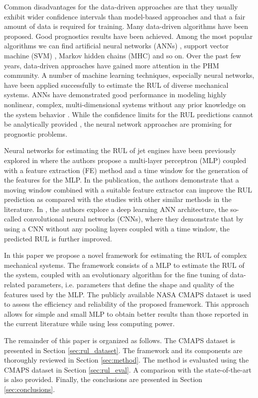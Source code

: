 \documentclass[12pt]{IEEEtran}%
\begin{document}
Common disadvantages for the data-driven approaches are that they usually
exhibit wider confidence intervals than model-based approaches and that a fair
amount of data is required for training. Many data-driven algorithms have been
proposed. Good prognostics results have been achieved. Among the most popular
algorithms we can find artificial neural networks (ANNs) \cite{Gebraeel2004},
support vector machine (SVM) \cite{Benkedjouh2013}, Markov hidden chains (MHC)
\cite{Dong2007} and so on. Over the past few years, data-driven approaches
have gained more attention in the PHM community. A number of machine learning
techniques, especially neural networks, have been applied successfully to
estimate the RUL of diverse mechanical systems. ANNs have demonstrated good
performance in modeling highly nonlinear, complex, multi-dimensional systems
without any prior knowledge on the system behavior \cite{Li2018}. While the
confidence limits for the RUL predictions cannot be analytically provided
\cite{Sikorska2011}, the neural network approaches are promising for
prognostic problems.

Neural networks for estimating the RUL of jet engines have been previously
explored in \cite{Lim2016} where the authors propose a multi-layer perceptron
(MLP) coupled with a feature extraction (FE) method and a time window for the
generation of the features for the MLP. In the publication, the authors
demonstrate that a moving window combined with a suitable feature extractor
can improve the RUL prediction as compared with the studies with other similar
methods in the literature. In \cite{Li2018}, the authors explore a deep
learning ANN architecture, the so-called convolutional neural networks (CNNs),
where they demonstrate that by using a CNN without any pooling layers coupled
with a time window, the predicted RUL is further improved.

In this paper we propose a novel framework for estimating the RUL of complex
mechanical systems. The framework consists of a MLP to estimate the RUL of the
system, coupled with an evolutionary algorithm for the fine tuning of
data-related parameters, i.e. parameters that define the shape and quality of
the features used by the MLP. The publicly available NASA CMAPS dataset
\cite{CMAPS2008} is used to assess the efficiency and reliability of the
proposed framework. This approach allows for simple and small MLP to obtain
better results than those reported in the current literature while using less
computing power.

The remainder of this paper is organized as follows. The CMAPS dataset is
presented in Section \ref{sec:rul_dataset}. The framework and its components
are thoroughly reviewed in Section \ref{sec:method}. The method is evaluated
using the CMAPS dataset in Section \ref{sec:rul_eval}. A comparison with the
state-of-the-art is also provided. Finally, the conclusions are presented in
Section \ref{sec:conclusions}.
\end{document}
